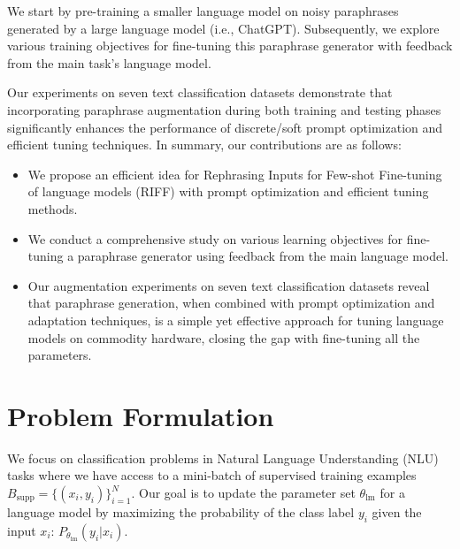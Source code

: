 \documentclass[11pt]{article}
\begin{document}
We start by pre-training a smaller language model on noisy paraphrases generated by a large language model (i.e., ChatGPT). Subsequently, we explore various training objectives for fine-tuning this paraphrase generator with feedback from the main task's language model.

Our experiments on seven text classification datasets demonstrate that incorporating paraphrase augmentation during both training and testing phases significantly enhances the performance of discrete/soft prompt optimization and efficient tuning techniques. In summary, our contributions are as follows:
\begin{itemize}
\item We propose an efficient idea for Rephrasing Inputs for Few-shot Fine-tuning of language models (RIFF) with prompt optimization and efficient tuning methods.
\item We conduct a comprehensive study on various learning objectives for fine-tuning a paraphrase generator using feedback from the main language model.
\item Our augmentation experiments on seven text classification datasets reveal that paraphrase generation, when combined with prompt optimization and adaptation techniques, is a simple yet effective approach for tuning language models on commodity hardware, closing the gap with fine-tuning all the parameters.
\end{itemize}

\section{Problem Formulation}
We focus on classification problems in Natural Language Understanding (NLU) tasks where we have access to a mini-batch of supervised training examples $B_{\text{supp}} = \{(x_i, y_i)\}_{i=1}^{N}$. Our goal is to update the parameter set $\theta_{\text{lm}}$ for a language model by maximizing the probability of the class label $y_i$ given the input $x_i$: $P_{\theta_{\text{lm}}} (y_i | x_i)$.
\end{document}
